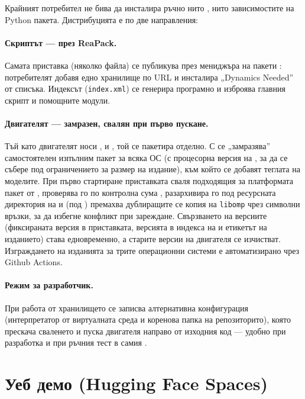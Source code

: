 Крайният потребител не бива да инсталира ръчно нито ,
нито зависимостите на Python пакета.
Дистрибуцията е по две направления:

\paragraph{Скриптът — през ReaPack.} Самата приставка (няколко 
файла) се публикува през мениджъра на пакети : потребителят добавя
едно хранилище по URL и инсталира „Dynamics Needed'' от списъка. Индексът
(\texttt{index.xml}) се генерира програмно и изброява главния скрипт и помощните
модули.

\paragraph{Двигателят — замразен, свалян при първо пускане.} Тъй като двигателят
носи ,  и , той се пакетира отделно.
С  се „замразява'' самостоятелен изпълним пакет за всяка ОС (с
процесорна версия на , за да се събере под ограничението за размер на
издание), към който се добавят теглата на моделите. При първо стартиране
приставката сваля подходящия за платформата пакет от ,
проверява го по контролна сума , разархивира го под ресурсната
директория на  и (под ) премахва дублиращите се копия на
\texttt{libomp} чрез символни връзки, за да избегне конфликт при зареждане.
Свързването на версиите (фиксираната версия в приставката, версията в индекса на
 и етикетът на изданието) става едновременно, а старите версии на
двигателя се изчистват. Изграждането на изданията за трите операционни системи е
автоматизирано чрез Github Actions.

\paragraph{Режим за разработчик.} При работа от хранилището се записва
алтернативна конфигурация (интерпретатор от виртуалната среда и коренова папка на
репозиторито), която прескача сваленето и пуска двигателя направо от изходния код —
удобно при разработка и при ръчния тест в самия .

\section{Уеб демо (Hugging Face Spaces)}
\label{sec:demo}

